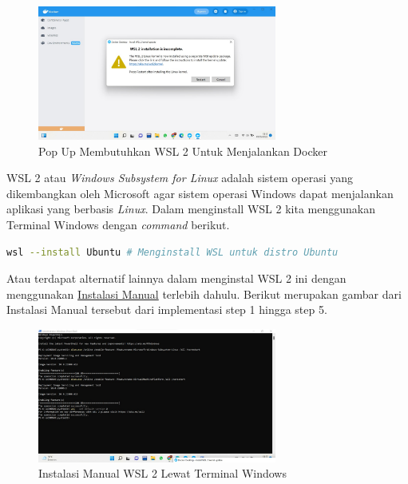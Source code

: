 \documentclass[11pt,a4paper]{article}
\begin{document}
\newpage
    \begin{figure}[h]
    \centering
    \includegraphics[width = 0.7\textwidth]{Figures/requiremnents_1.png}
    \caption{Pop Up Membutuhkan WSL 2 Untuk Menjalankan Docker}
    \end{figure}

    WSL 2 atau \textit{Windows Subsystem for Linux} adalah sistem operasi yang dikembangkan oleh Microsoft agar sistem operasi Windows
    dapat menjalankan aplikasi yang berbasis \textit{Linux}. Dalam menginstall WSL 2 kita menggunakan Terminal Windows dengan \textit{command} 
    berikut. 
    \begin{lstlisting}[language=bash]
        wsl --install Ubuntu # Menginstall WSL untuk distro Ubuntu
    \end{lstlisting}

    Atau terdapat alternatif lainnya dalam menginstal WSL 2 ini dengan menggunakan \href{https://docs.microsoft.com/en-us/windows/wsl/install-manual#step-1---enable-the-windows-subsystem-for-linux}{Instalasi Manual}
    terlebih dahulu. Berikut merupakan gambar dari Instalasi Manual tersebut dari implementasi step 1 hingga step 5.
    \begin{figure}[h]
        \centering
        \includegraphics[width = 0.7\textwidth]{Figures/wsl-install_1.png}
        \caption{Instalasi Manual WSL 2 Lewat Terminal Windows}
    \end{figure}
\end{document}
